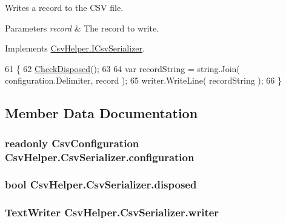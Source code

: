 Writes a record to the C\-S\-V file. 


\begin{DoxyParams}{Parameters}
{\em record} & The record to write.\\
\hline
\end{DoxyParams}


Implements \hyperlink{a00092_a0b442858eef85b7d933662359646fd0b}{Csv\-Helper.\-I\-Csv\-Serializer}.


\begin{DoxyCode}
61         \{
62             \hyperlink{a00059_ae14e1913a4e76faf97484c1bde339143}{CheckDisposed}();
63 
64             var recordString = string.Join( configuration.Delimiter, record );
65             writer.WriteLine( recordString );
66         \}
\end{DoxyCode}


\subsection{Member Data Documentation}
\hypertarget{a00059_ae8c56ff97c0a797245f2205c486833ea}{
\subsubsection[{configuration}]{\setlength{\rightskip}{0pt plus 5cm}readonly {\bf Csv\-Configuration} Csv\-Helper.\-Csv\-Serializer.\-configuration\hspace{0.3cm}{\ttfamily [private]}}}\label{a00059_ae8c56ff97c0a797245f2205c486833ea}
\hypertarget{a00059_a2687885dae7f7b0eec3c2db81c05f7e4}{
\subsubsection[{disposed}]{\setlength{\rightskip}{0pt plus 5cm}bool Csv\-Helper.\-Csv\-Serializer.\-disposed\hspace{0.3cm}{\ttfamily [private]}}}\label{a00059_a2687885dae7f7b0eec3c2db81c05f7e4}
\hypertarget{a00059_adfb235fa2c868fc79c0376fd12fda767}{
\subsubsection[{writer}]{\setlength{\rightskip}{0pt plus 5cm}Text\-Writer Csv\-Helper.\-Csv\-Serializer.\-writer\hspace{0.3cm}{\ttfamily [private]}}}\label{a00059_adfb235fa2c868fc79c0376fd12fda767}


